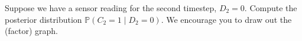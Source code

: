 \item {}
Suppose we have a sensor reading for the second timestep, $D_2 = 0$. Compute the
posterior distribution $\mathbb P(C_2 = 1 \mid D_2 = 0)$. We encourage you to
draw out the (factor) graph.
